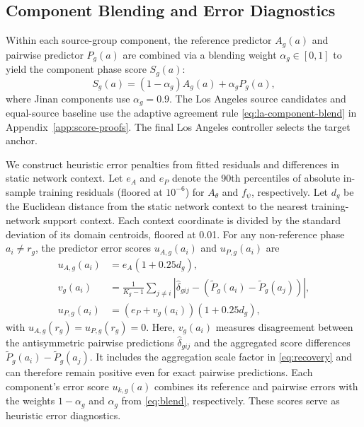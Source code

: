 \documentclass[letterpaper,journal]{IEEEtran}
\begin{document}
\subsection{Component Blending and Error Diagnostics}
Within each source-group component, the reference predictor $A_g(a)$ and pairwise predictor $P_g(a)$ are combined via a blending weight $\alpha_g \in [0, 1]$ to yield the component phase score $S_g(a)$:
\begin{equation}
 S_g(a)=(1-\alpha_g)A_g(a)+\alpha_gP_g(a),
 \label{eq:blend}
\end{equation}
where Jinan components use $\alpha_g=0.9$. The Los Angeles source candidates and equal-source baseline use the adaptive agreement rule \eqref{eq:la-component-blend} in Appendix~\ref{app:score-proofs}. The final Los Angeles controller selects the target anchor.

We construct heuristic error penalties from fitted residuals and differences in static network context. Let $e_A$ and $e_P$ denote the 90th percentiles of absolute in-sample training residuals (floored at $10^{-6}$) for $A_\theta$ and $f_\psi$, respectively. Let $d_g$ be the Euclidean distance from the static network context to the nearest training-network support context. Each context coordinate is divided by the standard deviation of its domain centroids, floored at 0.01. For any non-reference phase $a_i \ne r_g$, the predictor error scores $u_{A,g}(a_i)$ and $u_{P,g}(a_i)$ are
\begin{align}
 u_{A,g}(a_i)&=e_A(1+0.25d_g),\nonumber\\
 v_g(a_i)&=\frac{1}{K_g-1}\sum_{j\ne i}
 \left|\widehat\delta_{gij}-(\widetilde P_g(a_i)-\widetilde P_g(a_j))\right|,\nonumber\\
 u_{P,g}(a_i)&=(e_P+v_g(a_i))(1+0.25d_g),
 \label{eq:error_scores}
\end{align}
with $u_{A,g}(r_g)=u_{P,g}(r_g)=0$. Here, $v_g(a_i)$ measures disagreement between the antisymmetric pairwise predictions $\widehat\delta_{gij}$ and the aggregated score differences $\widetilde P_g(a_i)-\widetilde P_g(a_j)$. It includes the aggregation scale factor in \eqref{eq:recovery} and can therefore remain positive even for exact pairwise predictions. Each component's error score $u_{k,g}(a)$ combines its reference and pairwise errors with the weights $1-\alpha_g$ and $\alpha_g$ from \eqref{eq:blend}, respectively. These scores serve as heuristic error diagnostics.
\end{document}
